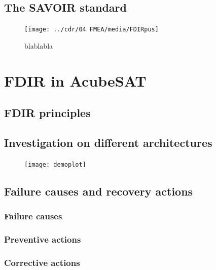 \documentclass[a4paper,nobib]{tufte-book}
\begin{document}
\section{The SAVOIR standard}

\begin{figure}[h]
	\texttt{[image: ../cdr/04 FMEA/media/FDIRpus]}
	\caption{blablabla}
\end{figure}

\chapter{\ac{FDIR} in AcubeSAT}

\section{\ac{FDIR} principles}


\section{Investigation on different architectures}

\begin{figure}
	\centering
	\texttt{[image: demoplot]}
	\caption{}
\end{figure}

\FloatBarrier
\section{Failure causes and recovery actions}

\subsection{Failure causes}

\subsection{Preventive actions}

\subsection{Corrective actions}
\end{document}
